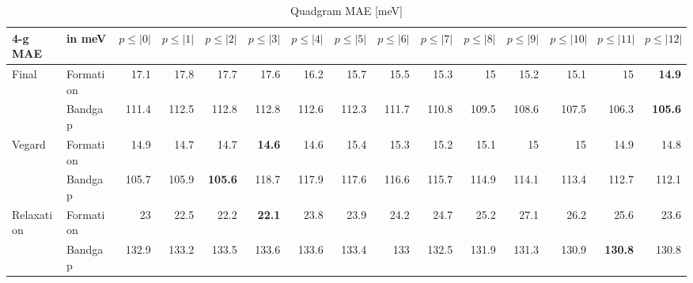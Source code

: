 \documentclass[11pt,oneside,czech,american]{book} %
\theoremstyle{definition} %
\theoremstyle{definition}
\begin{document}
\begin{table}[H]
	\scriptsize
	\centering
\begin{tabular}{llrrrrrrrrrrrrr}
	\hline
	4-g MAE    & in meV    &   $p{\leq}|0|$ &   $p{\leq}|1|$ &   $p{\leq}|2|$ &   $p{\leq}|3|$ &   $p{\leq}|4|$ &   $p{\leq}|5|$ &   $p{\leq}|6|$ &   $p{\leq}|7|$ &   $p{\leq}|8|$ &   $p{\leq}|9|$ &   $p{\leq}|10|$ &   $p{\leq}|11|$ &   $p{\leq}|12|$\\
	\hline
	\multirow{2}{*}{Final}      & Formation &       17.1 &       17.8 &       17.7 &       17.6 &       16.2 &       15.7 &       15.5 &       15.3 &       15   &       15.2 &        15.1 &        15   &        \textbf{14.9}\\
	      & Bandgap   &      111.4 &      112.5 &      112.8 &      112.8 &      112.6 &      112.3 &      111.7 &      110.8 &      109.5 &      108.6 &       107.5 &       106.3 &       \textbf{105.6}\\
	\multirow{2}{*}{Vegard}     & Formation &       14.9 &       14.7 &       14.7 &       \textbf{14.6} &       14.6 &       15.4 &       15.3 &       15.2 &       15.1 &       15   &        15   &        14.9 &        14.8\\
	     & Bandgap   &      105.7 &      105.9 &      \textbf{105.6} &      118.7 &      117.9 &      117.6 &      116.6 &      115.7 &      114.9 &      114.1 &       113.4 &       112.7 &       112.1\\
	\multirow{2}{*}{Relaxation} & Formation &       23   &       22.5 &       22.2 &       \textbf{22.1} &       23.8 &       23.9 &       24.2 &       24.7 &       25.2 &       27.1 &        26.2 &        25.6 &        23.6\\
	 & Bandgap   &      132.9 &      133.2 &      133.5 &      133.6 &      133.6 &      133.4 &      133  &      132.5 &      131.9 &      131.3 &       130.9 &       \textbf{130.8} &       130.8 \\
	\hline
\end{tabular}
	\caption{Quadgram MAE [meV]}
	\label{4-g MAE}
\end{table}
\end{document}
